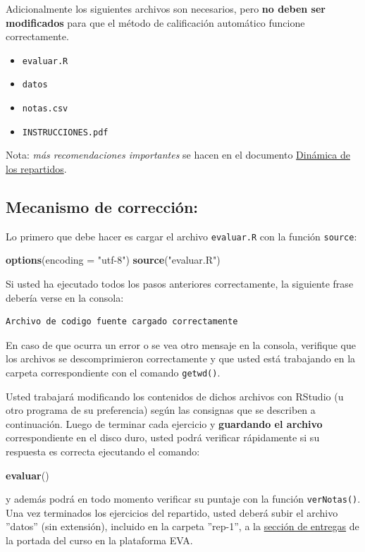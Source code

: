 \documentclass[]{article}
\newenvironment{Shaded}{}{}
\newcommand{\KeywordTok}[1]{\textcolor[rgb]{0.00,0.44,0.13}{\textbf{{#1}}}}
\newcommand{\DataTypeTok}[1]{\textcolor[rgb]{0.56,0.13,0.00}{{#1}}}
\newcommand{\StringTok}[1]{\textcolor[rgb]{0.25,0.44,0.63}{{#1}}}
\newcommand{\NormalTok}[1]{{#1}}
\begin{document}
Adicionalmente los siguientes archivos son necesarios, pero \textbf{no
deben ser modificados} para que el método de calificación automático
funcione correctamente.

\begin{itemize}
\item
  \texttt{evaluar.R}
\item
  \texttt{datos}
\item
  \texttt{notas.csv}
\item
  \texttt{INSTRUCCIONES.pdf}
\end{itemize}
Nota: \emph{más recomendaciones importantes} se hacen en el documento
\href{http://eva.universidad.edu.uy/mod/resource/view.php?id=118422}{Dinámica
de los repartidos}.

\subsection{Mecanismo de corrección:}

Lo primero que debe hacer es cargar el archivo \texttt{evaluar.R} con la
función \texttt{source}:

\begin{Shaded}
\begin{Highlighting}[]
\KeywordTok{options}\NormalTok{(}\DataTypeTok{encoding =} \StringTok{"utf-8"}\NormalTok{)}
\KeywordTok{source}\NormalTok{(}\StringTok{"evaluar.R"}\NormalTok{)}
\end{Highlighting}
\end{Shaded}
Si usted ha ejecutado todos los pasos anteriores correctamente, la
siguiente frase debería verse en la consola:

\begin{verbatim}
Archivo de codigo fuente cargado correctamente
\end{verbatim}
En caso de que ocurra un error o se vea otro mensaje en la consola,
verifique que los archivos se descomprimieron correctamente y que usted
está trabajando en la carpeta correspondiente con el comando
\texttt{getwd()}.

Usted trabajará modificando los contenidos de dichos archivos con
RStudio (u otro programa de su preferencia) según las consignas que se
describen a continuación. Luego de terminar cada ejercicio y
\textbf{guardando el archivo} correspondiente en el disco duro, usted
podrá verificar rápidamente si su respuesta es correcta ejecutando el
comando:

\begin{Shaded}
\begin{Highlighting}[]
\KeywordTok{evaluar}\NormalTok{()}
\end{Highlighting}
\end{Shaded}
y además podrá en todo momento verificar su puntaje con la función
\texttt{verNotas()}. Una vez terminados los ejercicios del repartido,
usted deberá subir el archivo ''datos'' (sin extensión), incluido en la
carpeta ''rep-1'', a la
\href{http://eva.universidad.edu.uy/mod/assignment/view.php?id=93616}{sección
de entregas} de la portada del curso en la plataforma EVA.
\end{document}
